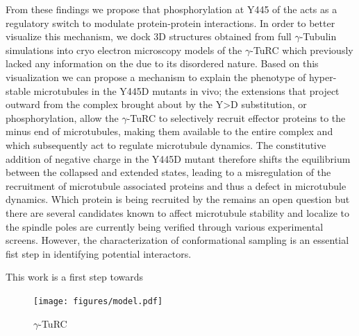 \begin{figure}
\centering     %
{}
\label{fig:wells}
\end{figure}

From these findings we propose that phosphorylation at Y445 of the \gct{} acts as a regulatory switch to modulate protein-protein interactions. In order to better visualize this mechanism, we dock 3D structures obtained from full $\gamma$-Tubulin simulations into cryo electron microscopy models of the $\gamma$-TuRC  which previously lacked any information on the \gct{} due to its disordered nature. Based on this visualization we can propose a mechanism to explain the phenotype of hyper-stable microtubules in the Y445D mutants in vivo; the extensions that project outward from the complex brought about by the Y>D substitution, or phosphorylation, allow the $\gamma$-TuRC to selectively recruit effector proteins to the minus end of microtubules, making them available to the entire complex and which subsequently act to regulate microtubule dynamics. The constitutive addition of negative charge in the Y445D mutant therefore shifts the equilibrium between the collapsed and extended states, leading to a misregulation of the recruitment of microtubule associated proteins and thus a defect in microtubule dynamics. Which protein is being recruited by the \gct{} remains an open question but there are several candidates known to affect microtubule stability and localize to the spindle poles  are currently being verified through various experimental screens. However, the characterization of \gct{} conformational sampling  is an essential fist step in identifying potential interactors. 

This work is a first step towards


\begin{figure}
\centering
\texttt{[image: figures/model.pdf]}
\caption{$\gamma$-TuRC}
\label{fig:turc}
\end{figure}
